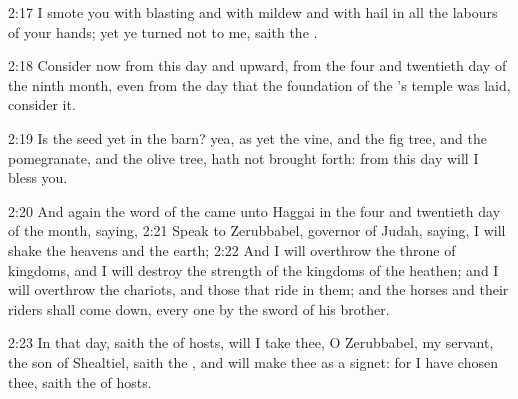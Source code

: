 2:17 I smote you with blasting and with mildew and with hail in all the labours of your hands; yet ye turned not to me, saith the \LORD.

2:18 Consider now from this day and upward, from the four and twentieth day of the ninth month, even from the day that the foundation of the \LORD's temple was laid, consider it.

2:19 Is the seed yet in the barn? yea, as yet the vine, and the fig tree, and the pomegranate, and the olive tree, hath not brought forth: from this day will I bless you.

2:20 And again the word of the \LORD came unto Haggai in the four and twentieth day of the month, saying, 2:21 Speak to Zerubbabel, governor of Judah, saying, I will shake the heavens and the earth; 2:22 And I will overthrow the throne of kingdoms, and I will destroy the strength of the kingdoms of the heathen; and I will overthrow the chariots, and those that ride in them; and the horses and their riders shall come down, every one by the sword of his brother.

2:23 In that day, saith the \LORD of hosts, will I take thee, O Zerubbabel, my servant, the son of Shealtiel, saith the \LORD, and will make thee as a signet: for I have chosen thee, saith the \LORD of hosts.

